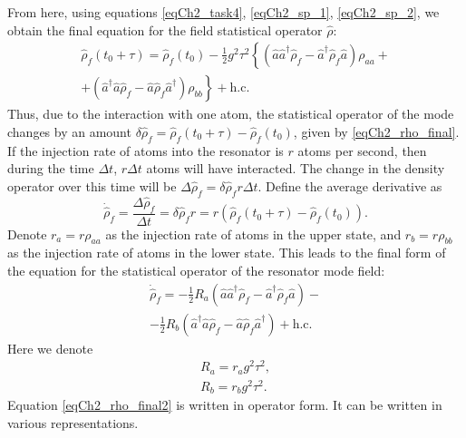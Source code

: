 From here, using equations \eqref{eqCh2_task4},
\eqref{eqCh2_sp_1}, \eqref{eqCh2_sp_2}, we obtain the final equation for the field statistical operator $\hat{\rho}$:  
\begin{eqnarray}
\hat{\rho}_{f}\left(t_0 + \tau\right) =
\hat{\rho}_{f}\left(t_0\right) - \frac{1}{2}g^2 \tau^2
\left\{
\left(\hat{a}\hat{a}^{\dag}\hat{\rho}_{f} - 
\hat{a}^{\dag}\hat{\rho}_{f}\hat{a}
\right)\rho_{aa} +
\right.
\nonumber \\
\left.
+
\left(\hat{a}^{\dag}\hat{a}\hat{\rho}_{f} - 
\hat{a}\hat{\rho}_{f}\hat{a}^{\dag}
\right)\rho_{bb}
\right\} + \text{h.c.}
\label{eqCh2_rho_final}
\end{eqnarray}
Thus, due to the interaction with one atom, the statistical operator of the mode changes by an amount 
\(
\delta\hat{\rho}_{f}=
\hat{\rho}_{f}\left(t_0 + \tau\right) -
\hat{\rho}_{f}\left(t_0\right)
\), given by \eqref{eqCh2_rho_final}. If the injection rate of atoms into the resonator is $r$ atoms per second, then during the time $\Delta t$, $r \Delta t$ atoms will have interacted. The change in the density operator over this time will be 
$\Delta \hat{\rho}_{f} = \delta\hat{\rho}_{f}r \Delta t$. Define the average derivative as 
\[
\dot{\hat{\rho}}_{f} = \frac{\Delta \hat{\rho}_{f}}{\Delta t} = 
\delta\hat{\rho}_{f} r = r 
\left(
\hat{\rho}_{f}\left(t_0 + \tau\right) -
\hat{\rho}_{f}\left(t_0\right)
\right).
\]
Denote $r_a = r \rho_{aa}$ as the injection rate of atoms in the upper state, and $r_b = r \rho_{bb}$ as the injection rate of atoms in the lower state. This leads to the final form of the equation for the statistical operator of the resonator mode field:
\begin{eqnarray}
\dot{\hat{\rho}}_{f} =
- \frac{1}{2}R_a
\left(\hat{a}\hat{a}^{\dag}\hat{\rho}_{f} - 
\hat{a}^{\dag}\hat{\rho}_{f}\hat{a}
\right)
- 
\nonumber \\
- \frac{1}{2}R_b
\left(\hat{a}^{\dag}\hat{a}\hat{\rho}_{f} - 
\hat{a}\hat{\rho}_{f}\hat{a}^{\dag}
\right)
 + \text{h.c.}
\label{eqCh2_rho_final2}
\end{eqnarray}
Here we denote 
\begin{eqnarray}
R_a=r_a g^2\tau^2,
\nonumber \\
R_b=r_b g^2\tau^2.
\label{eqCh2_RaRbDefenition}
\end{eqnarray}
Equation
\eqref{eqCh2_rho_final2} is written in operator form. It can be written in various representations.